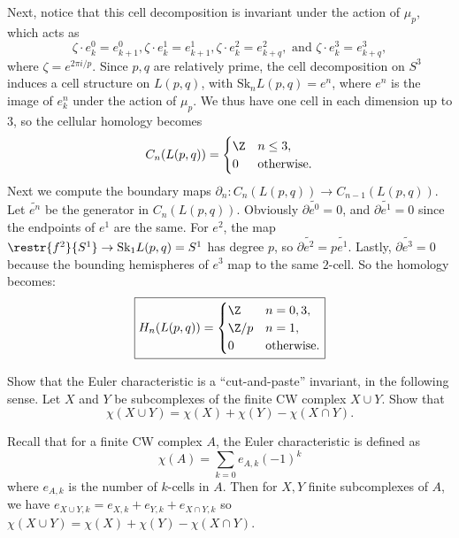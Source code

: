 \documentclass[11pt,letterpaper]{article}
\providecommand{\Sk}{\text{Sk}}
\begin{document}
\begin{solution}
    \quad Next, notice that this cell decomposition is invariant under the action of $\mu_p$, which acts as
    \[
        \zeta\cdot e_k^0 = e_{k+1}^0, \zeta\cdot e^1_k = e_{k+1}^1, \zeta\cdot e^2_k = e_{k+q}^2, \text{ and } \zeta\cdot e^3_k = e_{k+q}^3
    ,\]  
    where $\zeta=e^{2\pi i /p}$. Since $p,q$ are relatively prime, the cell decomposition on $S^3$ induces a cell structure on $L(p,q)$, with $\Sk_n L(p,q)=e^n$, where $e^n$ is the image of $e^n_k$ under the action of $\mu_p$. We thus have one cell in each dimension up to $3$, so the cellular homology becomes
    \[
        C_n(L(p,q)) = \begin{cases}
            \Z & n\leq 3,\\
            0 & \text{otherwise}.
        \end{cases}
    \]  
    \quad Next we compute the boundary maps $\partial_n : C_n(L(p,q)) \to C_{n-1}(L(p,q))$. Let $\widetilde{e^n}$ be the generator in $C_n(L(p,q))$. Obviously $\partial \widetilde{e^0} = 0$, and $\partial \widetilde{e^1}=0$ since the endpoints of $e^1$ are the same. For $e^2$, the map $\restr{f^2}{S^1} \to \Sk_1L(p,q)=S^1$ has degree $p$, so $\partial \widetilde{e^2} = p\widetilde{e^1}$. Lastly, $\partial \widetilde{e^3} = 0$ because the bounding hemispheres of $e^3$ map to the same $2$-cell. So the homology becomes:
    \[
        \boxed{H_n(L(p,q))=\begin{cases}
            \Z & n =0,3,\\
            \Z / p & n=1,\\
            0 & \text{otherwise}.
        \end{cases}}
    \]
\end{solution}

\begin{problem}
    Show that the Euler characteristic is a ``cut-and-paste'' invariant, in the following sense. Let $X$ and $Y$ be subcomplexes of the finite CW complex $X \cup Y$. Show that
    \[
        \chi (X\cup Y) = \chi(X) + \chi(Y) - \chi(X\cap Y)
    .\]
\end{problem}

\begin{solution}
    Recall that for a finite CW complex $A$, the Euler characteristic is defined as
    \[
        \chi(A) =\sum_{k=0} e_{A,k} (-1)^k
    \] 
    where $e_{A,k}$ is the number of $k$-cells in $A$. Then for $X,Y$ finite subcomplexes of $A$, we have $e_{X\cup Y,k} = e_{X,k}+e_{Y,k}+e_{X\cap Y, k}$ so $\chi (X\cup Y) = \chi(X) + \chi(Y) - \chi(X\cap Y)$.
\end{solution}
\end{document}
